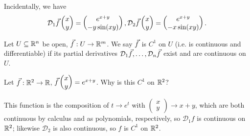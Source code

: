 \documentclass[main.tex]{subfiles}
\begin{document}
Incidentally, we have
\[\mathcal{D}_1\vec{f}\begin{pmatrix}
    x \\ y
\end{pmatrix} = \begin{pmatrix}
    e^{x + y} \\ -y\sin(xy)
\end{pmatrix}, \mathcal{D}_2\vec{f}\begin{pmatrix}
    x \\ y
\end{pmatrix} = \begin{pmatrix}
    e^{x + y} \\ -x\sin(xy)
\end{pmatrix}.\]
\begin{definition}
    Let $U\subseteq \mathbb R^n$ be open, $\vec{f} : U \to \mathbb R^m$. We say $\vec{f}$ is $C^1$ on $U$ (i.e. is continuous and differentiable) if its partial derivatives $\mathcal{D}_1\vec{f}, \ldots , \mathcal{D}_n\vec{f}$ exist and are continuous on $U$.
\end{definition}
\begin{example}
    Let $\vec{f} : \mathbb R^2 \to \mathbb R$, $\vec{f}\begin{pmatrix}
        x \\ y
    \end{pmatrix} = e^{x + y}$. Why is this $C^1$ on $\mathbb R^2$?
\end{example}
This function is the composition of $t\to e^t$ with $\begin{pmatrix}
    x \\ y
\end{pmatrix}\to x + y$, which are both continuous by calculus and as polynomials, respectively, so $\mathcal{D}_1f$ is continuous on $\mathbb R^2$; likewise $\mathcal{D}_2$ is also continuous, so $f$ is $C^1$ on $\mathbb R^2$.
\end{document}

